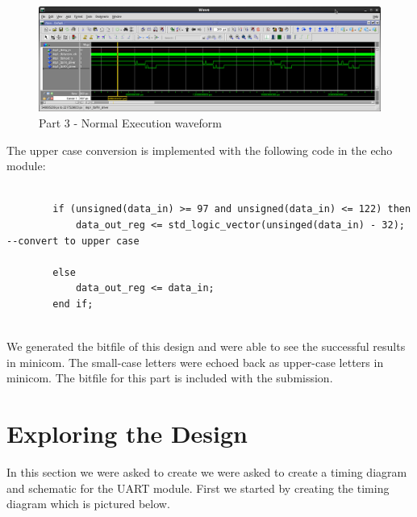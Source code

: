\documentclass{article}
\begin{document}
	\begin{figure}[h]
		\begin{center}
			\includegraphics[scale=0.35]{../part3_files/MP1-Normal_Execution.png}
			\caption{Part 3 - Normal Execution waveform}
		\end{center}
	\end{figure}

The upper case conversion is implemented with the following code in the echo module:

\begin{center}

	\begin{lstlisting}[style=vhdl]
	
		if (unsigned(data_in) >= 97 and unsigned(data_in) <= 122) then
			data_out_reg <= std_logic_vector(unsinged(data_in) - 32);		--convert to upper case
			
		else
			data_out_reg <= data_in;
		end if;
	
	\end{lstlisting}

\end{center}

We generated the bitfile of this design and were able to see the successful results in minicom. The small-case letters were echoed back as upper-case letters in minicom. The bitfile for this part is included with the submission.


\section{Exploring the Design}
In this section we were asked to create we were asked to create a timing diagram and schematic for the UART module. First we started by creating the timing diagram which is pictured below. 
\end{document}
